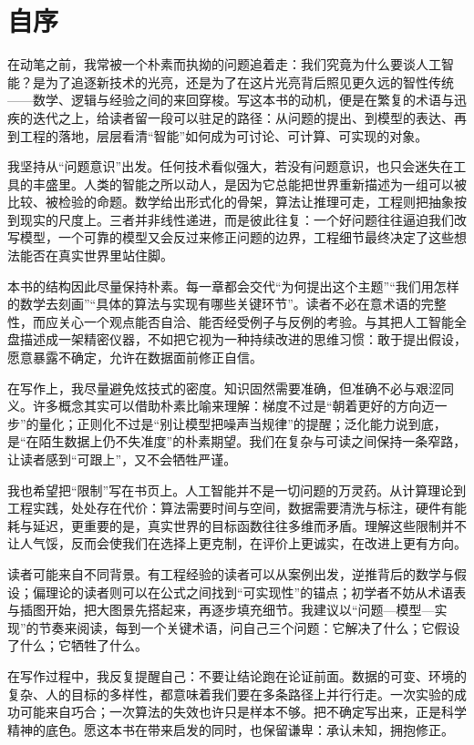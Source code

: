 \chapter*{自序}

在动笔之前，我常被一个朴素而执拗的问题追着走：我们究竟为什么要谈人工智能？是为了追逐新技术的光亮，还是为了在这片光亮背后照见更久远的智性传统——数学、逻辑与经验之间的来回穿梭。写这本书的动机，便是在繁复的术语与迅疾的迭代之上，给读者留一段可以驻足的路径：从问题的提出、到模型的表达、再到工程的落地，层层看清“智能”如何成为可讨论、可计算、可实现的对象。

我坚持从“问题意识”出发。任何技术看似强大，若没有问题意识，也只会迷失在工具的丰盛里。人类的智能之所以动人，是因为它总能把世界重新描述为一组可以被比较、被检验的命题。数学给出形式化的骨架，算法让推理可走，工程则把抽象按到现实的尺度上。三者并非线性递进，而是彼此往复：一个好问题往往逼迫我们改写模型，一个可靠的模型又会反过来修正问题的边界，工程细节最终决定了这些想法能否在真实世界里站住脚。

本书的结构因此尽量保持朴素。每一章都会交代“为何提出这个主题”“我们用怎样的数学去刻画”“具体的算法与实现有哪些关键环节”。读者不必在意术语的完整性，而应关心一个观点能否自洽、能否经受例子与反例的考验。与其把人工智能全盘描述成一架精密仪器，不如把它视为一种持续改进的思维习惯：敢于提出假设，愿意暴露不确定，允许在数据面前修正自信。

在写作上，我尽量避免炫技式的密度。知识固然需要准确，但准确不必与艰涩同义。许多概念其实可以借助朴素比喻来理解：梯度不过是“朝着更好的方向迈一步”的量化；正则化不过是“别让模型把噪声当规律”的提醒；泛化能力说到底，是“在陌生数据上仍不失准度”的朴素期望。我们在复杂与可读之间保持一条窄路，让读者感到“可跟上”，又不会牺牲严谨。

我也希望把“限制”写在书页上。人工智能并不是一切问题的万灵药。从计算理论到工程实践，处处存在代价：算法需要时间与空间，数据需要清洗与标注，硬件有能耗与延迟，更重要的是，真实世界的目标函数往往多维而矛盾。理解这些限制并不让人气馁，反而会使我们在选择上更克制，在评价上更诚实，在改进上更有方向。

读者可能来自不同背景。有工程经验的读者可以从案例出发，逆推背后的数学与假设；偏理论的读者则可以在公式之间找到“可实现性”的锚点；初学者不妨从术语表与插图开始，把大图景先搭起来，再逐步填充细节。我建议以“问题—模型—实现”的节奏来阅读，每到一个关键术语，问自己三个问题：它解决了什么；它假设了什么；它牺牲了什么。

在写作过程中，我反复提醒自己：不要让结论跑在论证前面。数据的可变、环境的复杂、人的目标的多样性，都意味着我们要在多条路径上并行行走。一次实验的成功可能来自巧合；一次算法的失效也许只是样本不够。把不确定写出来，正是科学精神的底色。愿这本书在带来启发的同时，也保留谦卑：承认未知，拥抱修正。

